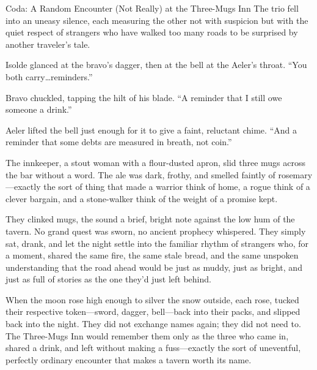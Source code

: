 \documentclass[12pt,oneside]{book}
\begin{document}
\begin{chapter*}{Coda: A Random Encounter (Not Really) at the Three-Mugs Inn}
The trio fell into an uneasy silence, each measuring the other not with suspicion but with the quiet respect of strangers who have walked too many roads to be surprised by another traveler's tale.

Isolde glanced at the bravo's dagger, then at the bell at the Aeler's throat. ``You both carry\dots reminders.''

Bravo chuckled, tapping the hilt of his blade. ``A reminder that I still owe someone a drink.''

Aeler lifted the bell just enough for it to give a faint, reluctant chime. ``And a reminder that some debts are measured in breath, not coin.''

The innkeeper, a stout woman with a flour-dusted apron, slid three mugs across the bar without a word. The ale was dark, frothy, and smelled faintly of rosemary---exactly the sort of thing that made a warrior think of home, a rogue think of a clever bargain, and a stone-walker think of the weight of a promise kept.

They clinked mugs, the sound a brief, bright note against the low hum of the tavern. No grand quest was sworn, no ancient prophecy whispered. They simply sat, drank, and let the night settle into the familiar rhythm of strangers who, for a moment, shared the same fire, the same stale bread, and the same unspoken understanding that the road ahead would be just as muddy, just as bright, and just as full of stories as the one they'd just left behind.

When the moon rose high enough to silver the snow outside, each rose, tucked their respective token---sword, dagger, bell---back into their packs, and slipped back into the night. They did not exchange names again; they did not need to. The Three-Mugs Inn would remember them only as the three who came in, shared a drink, and left without making a fuss---exactly the sort of uneventful, perfectly ordinary encounter that makes a tavern worth its name.

\end{chapter*}
\end{document}

